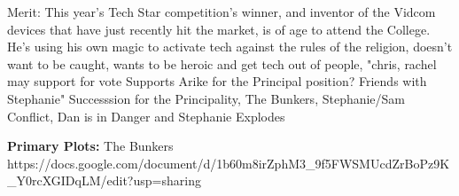 \documentclass[char]{GL2020}
\begin{document}
\name{\cTechStar{}}








Merit: This year's Tech Star competition's winner, and inventor of the Vidcom devices that have just recently hit the market, is of age to attend the College.  He's using his own magic to activate tech against the rules of the religion, doesn't want to be caught, wants to be heroic and get tech out of people, 	"chris, rachel may support for vote
Supports Arike for the Principal position? Friends with Stephanie"	Successsion for the Principality, The Bunkers, Stephanie/Sam Conflict, Dan is in Danger and Stephanie Explodes

\textbf{Primary Plots:}
The Bunkers
https://docs.google.com/document/d/1b60m8irZphM3_9f5FWSMUcdZrBoPz9K_Y0rcXGIDqLM/edit?usp=sharing
\end{document}
